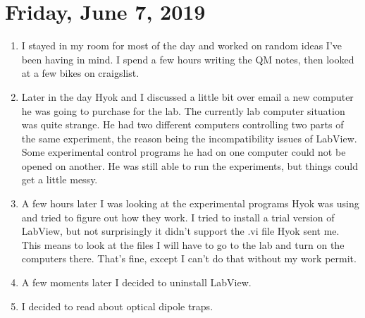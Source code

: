 \documentclass{report}
\theoremstyle{definition}
\begin{document}
\section{Friday, June 7, 2019}
\begin{enumerate}
	\item I stayed in my room for most of the day and worked on random ideas I've been having in mind. I spend a few hours writing the QM notes, then looked at a few bikes on craigslist. 
	
	\item Later in the day Hyok and I discussed a little bit over email a new computer he was going to purchase for the lab. The currently lab computer situation was quite strange. He had two different computers controlling two parts of the same experiment, the reason being the incompatibility issues of LabView. Some experimental control programs he had on one computer could not be opened on another. He was still able to run the experiments, but things could get a little messy. 
	
	\item A few hours later I was looking at the experimental programs Hyok was using and tried to figure out how they work. I tried to install a trial version of LabView, but not surprisingly it didn't support the .vi file Hyok sent me. This means to look at the files I will have to go to the lab and turn on the computers there. That's fine, except I can't do that without my work permit.
	
	\item A few moments later I decided to uninstall LabView. 
	
	\item I decided to read about optical dipole traps. 
\end{enumerate}
\end{document}
